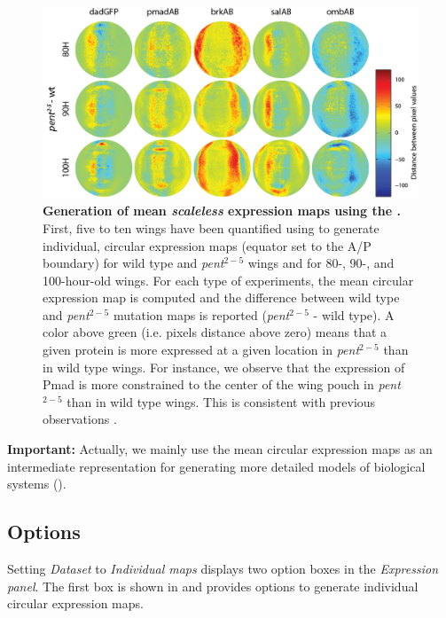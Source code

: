 \begin{figure}[!h]
\centering
\includegraphics[scale=0.4]{images/wingj_expression_maps_circular_demo.jpg}
\caption{\textbf{Generation of mean \textit{scaleless} expression maps using the \wingjMatlab.} First, five to ten wings have been quantified using \wingj to generate individual, circular expression maps (equator set to the A/P boundary) for wild type and \textit{pent$^{2-5}$} wings and for 80-, 90-, and 100-hour-old wings. For each type of experiments, the mean circular expression map is computed and the difference between wild type and \textit{pent$^{2-5}$} mutation maps is reported (\textit{pent$^{2-5}$} - wild type). A color above green (i.e. pixels distance above zero) means that a given protein is more expressed at a given location in \textit{pent$^{2-5}$} than in wild type wings. For instance, we observe that the expression of Pmad is more constrained to the center of the wing pouch in \textit{pent$^{2-5}$} than in wild type wings. This is consistent with previous observations \autocite{hamaratoglu2011dpp}.}
\label{fig:wingj_expression_maps_circular_demo}
\end{figure}

\textbf{Important:} Actually, we mainly use the mean circular expression maps as an intermediate representation for generating more detailed models of biological systems ().

\subsection{Options}
Setting \textit{Dataset} to \textit{Individual maps} displays two option boxes in the \textit{Expression panel}. The first box is shown in  and provides options to generate individual circular expression maps.

